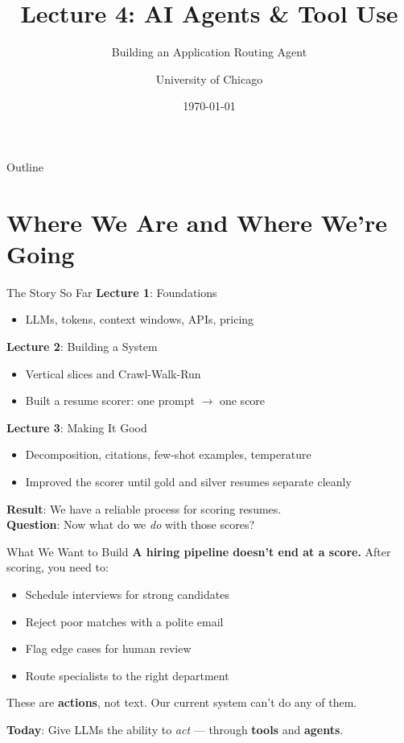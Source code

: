 \documentclass[aspectratio=169]{beamer}
\title{Lecture 4: AI Agents \& Tool Use}
\subtitle{Building an Application Routing Agent}
\author{University of Chicago}
\date{\today}
\begin{document}
\frame{\titlepage}

\begin{frame}{Outline}
  \tableofcontents
\end{frame}

\section{Where We Are and Where We're Going}

\begin{frame}{The Story So Far}
\textbf{Lecture 1}: Foundations
\begin{itemize}
    \item LLMs, tokens, context windows, APIs, pricing
\end{itemize}
\vspace{0.2cm}

\textbf{Lecture 2}: Building a System
\begin{itemize}
    \item Vertical slices and Crawl-Walk-Run
    \item Built a resume scorer: one prompt $\rightarrow$ one score
\end{itemize}
\vspace{0.2cm}

\textbf{Lecture 3}: Making It Good
\begin{itemize}
    \item Decomposition, citations, few-shot examples, temperature
    \item Improved the scorer until gold and silver resumes separate cleanly
\end{itemize}
\vspace{0.4cm}

\textbf{Result}: We have a reliable process for scoring resumes. \\
\textbf{Question}: Now what do we \textit{do} with those scores?
\end{frame}

\begin{frame}{What We Want to Build}
\textbf{A hiring pipeline doesn't end at a score.} After scoring, you need to:
\begin{itemize}
    \item Schedule interviews for strong candidates
    \item Reject poor matches with a polite email
    \item Flag edge cases for human review
    \item Route specialists to the right department
\end{itemize}
\vspace{0.3cm}

These are \textbf{actions}, not text. Our current system can't do any of them.
\vspace{0.3cm}

\textbf{Today}: Give LLMs the ability to \textit{act} --- through \textbf{tools} and \textbf{agents}.
\end{frame}
\end{document}
